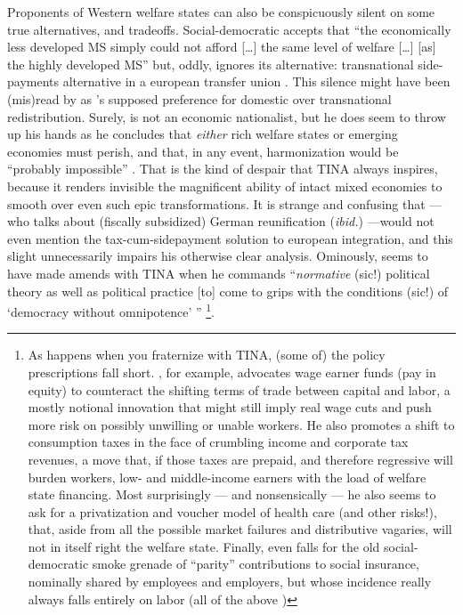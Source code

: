 \documentclass[11pt,a4paper,oneside,openright]{article}
\begin{document}
Proponents of Western welfare states can also be conspicuously silent on some true alternatives, and tradeoffs. 
Social-democratic \cite{Scharpf1997} accepts that ``the economically less developed \gls{MS} simply could not afford [\ldots] the same level of welfare [\ldots] [as] the highly developed \gls{MS}'' but, oddly, ignores its alternative: 
transnational side-payments alternative in a european transfer union \citep[26]{Scharpf1997}. 
This silence might have been (mis)read by \cite[619]{Moravcsik-2002-aa} as \citeauthor{Scharpf1997}'s supposed preference for domestic over transnational redistribution. 
Surely, \citeauthor{Scharpf1997} is not an economic nationalist, but he does seem to throw up his hands as he concludes that \emph{either} rich welfare states or emerging economies must perish, and that, in any event, harmonization would be ``probably impossible'' \citeyearpar[26]{Scharpf1997}. 
That is the kind of despair that TINA always inspires, because it renders invisible the magnificent ability of intact mixed economies to smooth over even such epic transformations. 
It is strange and confusing that \citeauthor{Scharpf1997} --- who talks about (fiscally subsidized) German reunification (\emph{ibid.}) ---would not even mention the tax-cum-sidepayment solution to european integration, and this slight unnecessarily impairs his otherwise clear analysis. 
Ominously, \citeauthor{Scharpf1997} seems to have made amends with TINA when he commands ``\emph{normative} (sic!) political theory as well as political practice [to] come to grips with the conditions (sic!) of `democracy without omnipotence' '' \citeyearpar[29]{Scharpf1997}
\footnote{
	As happens when you fraternize with TINA, (some of) the policy prescriptions fall short. 
\citeauthor{Scharpf1997}, for example, advocates wage earner funds (pay in equity) to counteract the shifting terms of trade between capital and labor, a mostly notional innovation that might still imply real wage cuts and push more risk on possibly unwilling or unable workers. 
	He also promotes a shift to consumption taxes in the face of crumbling income and corporate tax revenues, a move that, if those taxes are prepaid, and therefore regressive will burden workers, low- and middle-income earners with the load of welfare state financing.  
	Most surprisingly --- and nonsensically --- he also seems to ask for a privatization and voucher model of health care (and other risks!), that, aside from all the possible market failures and distributive vagaries, will not in itself right the welfare state. 
	Finally, \citeauthor{Scharpf1997} even falls for the old social-democratic smoke grenade of ``parity'' contributions to social insurance, nominally shared by employees and employers, but whose incidence really always falls entirely on labor (all of the above \citeyear[30-34]{Scharpf1997})
}.
\end{document}
